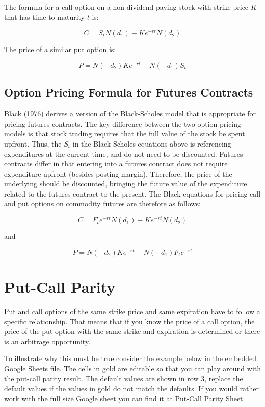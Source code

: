 \documentclass[
  letterpaper,
  DIV=11,
  numbers=noendperiod]{scrreprt}
\begin{document}
The formula for a call option on a non-dividend paying stock with strike
price \(K\) that has time to maturity \(t\) is:

\[C = S_{t}N(d_{1}) - K e^{-rt} N(d_{2})\]

The price of a similar put option is:

\[
P = N(-d_{2}) K e^{-rt} - N(-d_{1}) S_{t}
\]

\subsection{Option Pricing Formula for Futures
Contracts}\label{option-pricing-formula-for-futures-contracts}

Black (1976) derives a version of the Black-Scholes model that is
appropriate for pricing futures contracts. The key difference between
the two option pricing models is that stock trading requires that the
full value of the stock be spent upfront. Thus, the \(S_{t}\) in the
Black-Scholes equations above is referencing expenditures at the current
time, and do not need to be discounted. Futures contracts differ in that
entering into a futures contract does not require expenditure upfront
(besides posting margin). Therefore, the price of the underlying should
be discounted, bringing the future value of the expenditure related to
the futures contract to the present. The Black equations for pricing
call and put options on commodity futures are therefore as follows:

\[
C = F_{t} e^{-rt} N(d_{1}) - K e^{-rt} N(d_{2})
\]

and

\[
P = N(-d_{2}) K e^{-rt} - N(-d_{1}) F_{t} e^{-rt}
\]

\section{Put-Call Parity}\label{put-call-parity}

Put and call options of the same strike price and same expiration have
to follow a specific relationship. That means that if you know the price
of a call option, the price of the put option with the same strike and
expiration is determined or there is an arbitrage opportunity.

To illustrate why this must be true consider the example below in the
embedded Google Sheets file. The cells in gold are editable so that you
can play around with the put-call parity result. The default values are
shown in row 3, replace the default values if the values in gold do not
match the defaults. If you would rather work with the full size Google
sheet you can find it at
\href{https://docs.google.com/spreadsheets/d/1ivvTGqC9R4L3zkG8c4ApDg8dC1LHj4v_8uLjgiurxX0/edit?usp=sharing}{Put-Call
Parity Sheet}.
\end{document}
